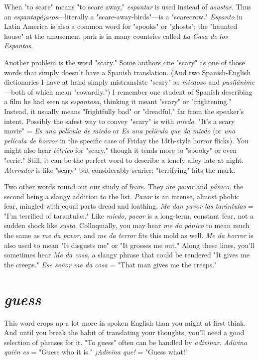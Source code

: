 When "to scare" means "to scare away," \emph{espantar} is used instead of \emph{asustar}. Thus an \emph{espantapájaros}---literally a "scare-away-birds"---is a "scarecrow." \emph{Espanto} in Latin America is also a common
word for "spooks" or "ghosts"; the "haunted house" at the amusement
park is in many countries called \emph{La Casa de los Espantos}.

Another problem is the word "scary." Some authors cite "scary"
as one of those words that simply doesn't have a Spanish translation.
(And two Spanish-English dictionaries I have at hand simply mistranslate "scary" as \emph{miedoso} and \emph{pusilánime}---both of which mean "cowardly.") I remember one student of Spanish describing a film he had
seen as \emph{espantosa}, thinking it meant "scary" or "frightening." Instead,
it usually means "frightfully bad" or "dreadful," far from the speaker's
intent. Possibly the safest way to convey "scary" is with \emph{miedo}. "It's a
scary movie" = \emph{Es una película de miedo} or \emph{Es una película que da
miedo} (or \emph{una película de horror} in the specific case of Friday the 13th-style horror flicks). You might also hear \emph{tétrico} for "scary," though
it tends more to "spooky" or even "eerie." Still, it can be the perfect
word to describe a lonely alley late at night. \emph{Aterrador} is like "scary"
but considerably scarier; "terrifying" hits the mark.

Two other words round out our study of fears. They are \emph{pavor}
and \emph{pánico}, the second being a slangy addition to the list. \emph{Pavor} is an
intense, almost phobic fear, mingled with equal parts dread and loathing. \emph{Me dan pavor las tarántulas} = "I'm terrified of tarantulas." Like
\emph{miedo}, \emph{pavor} is a long-term, constant fear, not a sudden shock like
\emph{susto}. Colloquially, you may hear \emph{me da pánico} to mean much the
same as \emph{me da pavor}, and \emph{me da terror} fits this mold as well. \emph{Me da
horror} is also used to mean "It disgusts me" or "It grosses me out."
Along these lines, you'll sometimes hear \emph{Me da cosa}, a slangy phrase
that could be rendered "It gives me the creeps." \emph{Ese señor me da cosa}
= "That man gives me the creeps."

\section{\emph{guess}}

This word crops up a lot more in spoken English than you
might at first think. And until you break the habit of translating your
thoughts, you'll need a good selection of phrases for it. "To guess" often can be handled by \emph{adivinar}. \emph{Adivina quién es} = "Guess who it
is." \emph{¡Adivina que!} = "Guess what!"

